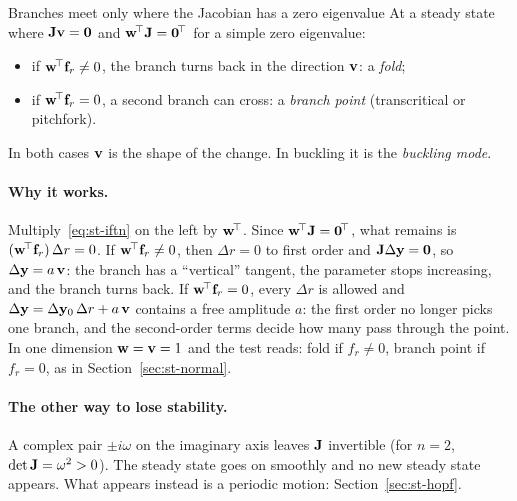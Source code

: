 \begin{gbox}{Branches meet only where the Jacobian has a zero eigenvalue}\label{sec:st-zero}
%
At a steady state where $\mathbf{J}\mathbf{v} = \mathbf{0}$ and $\mathbf{w}^{\!\top}\mathbf{J} = \mathbf{0}^{\!\top}$
for a simple zero eigenvalue:
\begin{itemize}
  \item if $\mathbf{w}^{\!\top}\mathbf{f}_r \neq 0$, the branch turns back in the direction
        $\mathbf{v}$: a \emph{fold};
  \item if $\mathbf{w}^{\!\top}\mathbf{f}_r = 0$, a second branch can cross: a \emph{branch point}
        (transcritical or pitchfork).
\end{itemize}
In both cases $\mathbf{v}$ is the shape of the change. In buckling it is the
\emph{buckling mode}.
\end{gbox}

\paragraph{Why it works.}
Multiply~\eqref{eq:st-iftn} on the left by $\mathbf{w}^{\!\top}$. Since
$\mathbf{w}^{\!\top}\mathbf{J} = \mathbf{0}^{\!\top}$, what remains is $(\mathbf{w}^{\!\top}\mathbf{f}_r)\,\Delta r = 0$.
If $\mathbf{w}^{\!\top}\mathbf{f}_r \neq 0$, then $\Delta r = 0$ to first order and
$\mathbf{J}\Delta\mathbf{y} = \mathbf{0}$, so $\Delta\mathbf{y} = a\,\mathbf{v}$: the branch has a
``vertical'' tangent, the parameter stops increasing, and the branch turns back.
If $\mathbf{w}^{\!\top}\mathbf{f}_r = 0$, every $\Delta r$ is allowed and
$\Delta\mathbf{y} = \Delta\mathbf{y}_0\,\Delta r + a\,\mathbf{v}$ contains a free amplitude
$a$: the first order no longer picks one branch, and the second-order terms decide
how many pass through the point. In one dimension $\mathbf{w} = \mathbf{v} = 1$ and the
test reads: fold if $f_r \neq 0$, branch point if $f_r = 0$, as in
Section~\ref{sec:st-normal}.

\paragraph{The other way to lose stability.}
A complex pair $\pm i\omega$ on the imaginary axis leaves $\mathbf{J}$ invertible
(for $n = 2$, $\det\mathbf{J} = \omega^2 > 0$). The steady state goes on smoothly and
no new steady state appears. What appears instead is a periodic motion:
Section~\ref{sec:st-hopf}.

